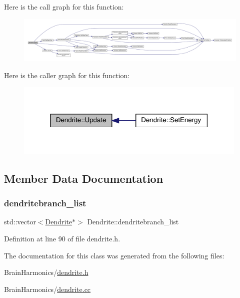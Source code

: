 Here is the call graph for this function\+:
\nopagebreak
\begin{figure}[H]
\begin{center}
\leavevmode
\includegraphics[width=350pt]{class_dendrite_a2e7bfde37bc7aec2547253ad038aaa04_cgraph}
\end{center}
\end{figure}
Here is the caller graph for this function\+:
\nopagebreak
\begin{figure}[H]
\begin{center}
\leavevmode
\includegraphics[width=315pt]{class_dendrite_a2e7bfde37bc7aec2547253ad038aaa04_icgraph}
\end{center}
\end{figure}


\subsection{Member Data Documentation}
\mbox{\label{class_dendrite_a1d57708bfa57443d3fa0358984b4c761}} 
\subsubsection{\texorpdfstring{dendritebranch\+\_\+list}{dendritebranch\_list}}
{\footnotesize\ttfamily std\+::vector$<$\hyperlink{class_dendrite}{Dendrite}$\ast$$>$ Dendrite\+::dendritebranch\+\_\+list\hspace{0.3cm}{\ttfamily [protected]}}



Definition at line 90 of file dendrite.\+h.



The documentation for this class was generated from the following files\+:\begin{DoxyCompactItemize}
\item 
Brain\+Harmonics/\hyperlink{dendrite_8h}{dendrite.\+h}\item 
Brain\+Harmonics/\hyperlink{dendrite_8cc}{dendrite.\+cc}\end{DoxyCompactItemize}
